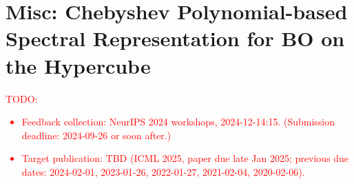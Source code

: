 \documentclass{article}
\begin{document}
\section{Misc: Chebyshev Polynomial-based Spectral Representation
  for BO on the Hypercube}

\textcolor{red}{TODO:
\begin{itemize}
\item
  Feedback collection: NeurIPS 2024 workshops, 2024-12-14:15.
  (Submission deadline: 2024-09-26 or soon after.)
\item
  Target publication: TBD (ICML 2025, paper due late Jan 2025; previous
  due dates: 2024-02-01, 2023-01-26, 2022-01-27, 2021-02-04,
  2020-02-06).
\end{itemize}
}





\end{document}
